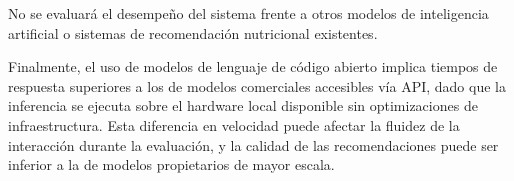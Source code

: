 No se evaluará el desempeño del sistema frente a otros modelos de
inteligencia artificial o sistemas de recomendación nutricional
existentes.

Finalmente, el uso de modelos de lenguaje de código abierto implica
tiempos de respuesta superiores a los de modelos comerciales
accesibles vía API, dado que la inferencia se ejecuta sobre el
hardware local disponible sin optimizaciones de infraestructura. Esta diferencia en velocidad puede afectar la fluidez
de la interacción durante la evaluación, y la calidad de las
recomendaciones puede ser inferior a la de modelos propietarios
de mayor escala.


